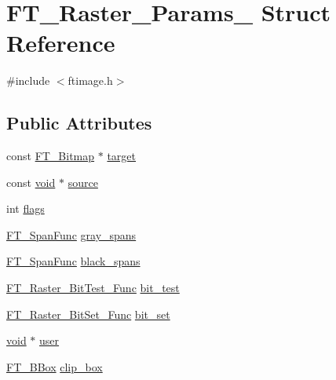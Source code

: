 \hypertarget{struct_f_t___raster___params__}{}\section{F\+T\+\_\+\+Raster\+\_\+\+Params\+\_\+ Struct Reference}
\label{struct_f_t___raster___params__}


{\ttfamily \#include $<$ftimage.\+h$>$}

\subsection*{Public Attributes}
\begin{DoxyCompactItemize}
\item 
const \mbox{\hyperlink{ftimage_8h_ae28691030f2d16376937cf5e3485f921}{F\+T\+\_\+\+Bitmap}} $\ast$ \mbox{\hyperlink{struct_f_t___raster___params___a2ba8941740db23ec91302aa9bd154da3}{target}}
\item 
const \mbox{\hyperlink{_s_d_l__opengles2__gl2ext_8h_ae5d8fa23ad07c48bb609509eae494c95}{void}} $\ast$ \mbox{\hyperlink{struct_f_t___raster___params___a9be95865384791b018f7a9665a062ee5}{source}}
\item 
int \mbox{\hyperlink{struct_f_t___raster___params___a1a28ab69b8296b4378886d1a2b57d333}{flags}}
\item 
\mbox{\hyperlink{ftimage_8h_abae5f0d92287252b367d3e8210ec4e3a}{F\+T\+\_\+\+Span\+Func}} \mbox{\hyperlink{struct_f_t___raster___params___a456191f1944775933e3d9d36c8632c35}{gray\+\_\+spans}}
\item 
\mbox{\hyperlink{ftimage_8h_abae5f0d92287252b367d3e8210ec4e3a}{F\+T\+\_\+\+Span\+Func}} \mbox{\hyperlink{struct_f_t___raster___params___a42c30e60ad5e243cf78833232e052b47}{black\+\_\+spans}}
\item 
\mbox{\hyperlink{ftimage_8h_a2ac5897dab423a944f4457a3131061e4}{F\+T\+\_\+\+Raster\+\_\+\+Bit\+Test\+\_\+\+Func}} \mbox{\hyperlink{struct_f_t___raster___params___aff3c1a2a7eda24136a46715128d24ed6}{bit\+\_\+test}}
\item 
\mbox{\hyperlink{ftimage_8h_a715e9f91407a9758dbefb6dd6549fe35}{F\+T\+\_\+\+Raster\+\_\+\+Bit\+Set\+\_\+\+Func}} \mbox{\hyperlink{struct_f_t___raster___params___ac66c3c44fcb63c254a46170d85d653c0}{bit\+\_\+set}}
\item 
\mbox{\hyperlink{_s_d_l__opengles2__gl2ext_8h_ae5d8fa23ad07c48bb609509eae494c95}{void}} $\ast$ \mbox{\hyperlink{struct_f_t___raster___params___af78bac59f93c989840bbcbcbefd77c55}{user}}
\item 
\mbox{\hyperlink{ftimage_8h_ae341c4eb5a7199947a13b2a1dcaf7af7}{F\+T\+\_\+\+B\+Box}} \mbox{\hyperlink{struct_f_t___raster___params___ab32f75f19d9cacb20e410886c055e306}{clip\+\_\+box}}
\end{DoxyCompactItemize}


